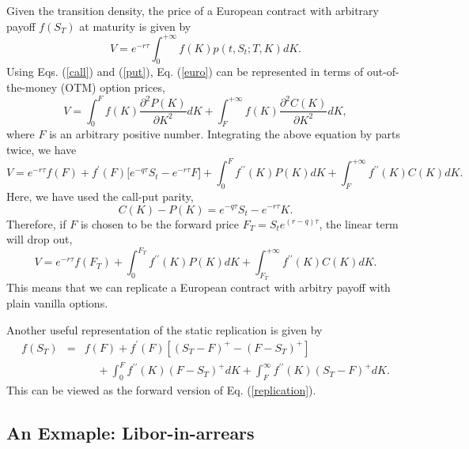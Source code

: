 \documentclass[12pt]{article}
\begin{document}
  Given the transition density, the price of a European contract with arbitrary payoff $f(S_T)$ at maturity is given by
  \begin{equation}
    V = e^{-r\tau}\int_{0}^{+\infty}f(K)p(t,S_t;T,K)dK.
    \label{euro}
  \end{equation}
  Using Eqs. (\ref{call}) and (\ref{put}), Eq. (\ref{euro}) can be represented in terms of out-of-the-money (OTM) option prices,
  \begin{equation}
    V = \int_{0}^{F}f(K)\frac{\partial^2P(K)}{\partial K^2}dK + \int_{F}^{+\infty}f(K)\frac{\partial^2C(K)}{\partial K^2}dK,
  \end{equation}
  where $F$ is an arbitrary positive number. Integrating the above equation by parts twice, we have
  \begin{equation}
    V = e^{-r\tau}f(F) + f^{\prime}(F)\big[e^{-q\tau}S_t-e^{-r\tau}F\big] +
           \int_{0}^{F}f^{\prime\prime}(K)P(K)dK + \int_{F}^{+\infty}f^{\prime\prime}(K)C(K)dK.
    \label{replication}
  \end{equation}
  Here, we have used the call-put parity,
  \begin{equation}
    C(K) - P(K) = e^{-q\tau}S_t-e^{-r\tau}K.
  \end{equation}
  Therefore, if $F$ is chosen to be the forward price $F_T=S_te^{(r-q)\tau}$, the linear term will drop out,
  \begin{equation}
    V = e^{-r\tau}f(F_T) +
           \int_{0}^{F_T}f^{\prime\prime}(K)P(K)dK + \int_{F_T}^{+\infty}f^{\prime\prime}(K)C(K)dK.
  \end{equation}
  This means that we can replicate a European contract with arbitry payoff with plain vanilla options.

  Another useful representation of the static replication is given by
  \begin{eqnarray}
    f(S_T)&=&f(F)+f^{\prime}(F)\left[\left(S_T-F\right)^+-\left(F-S_T\right)^+\right]\nonumber\\
            &&\ \ \ \ \ +\int_0^Ff^{\prime\prime}(K)\left(F-S_T\right)^+dK+\int_F^{\infty}f^{\prime\prime}(K)\left(S_T-F\right)^+dK.
    \label{replication2}
  \end{eqnarray}
  This can be viewed as the forward version of Eq. (\ref{replication}).

  \subsection{An Exmaple: Libor-in-arrears}
\end{document}
